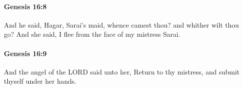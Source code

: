 		\paragraph{Genesis 16:8} %
			\label{GENESIS-16-8}

			And he said, Hagar, Sarai's maid, whence camest thou? and whither wilt thou go? And she said, I flee from the face of my mistress Sarai.


		\paragraph{Genesis 16:9} %
			\label{GENESIS-16-9}

			And the angel of the LORD said unto her, Return to thy mistress, and submit thyself under her hands.


